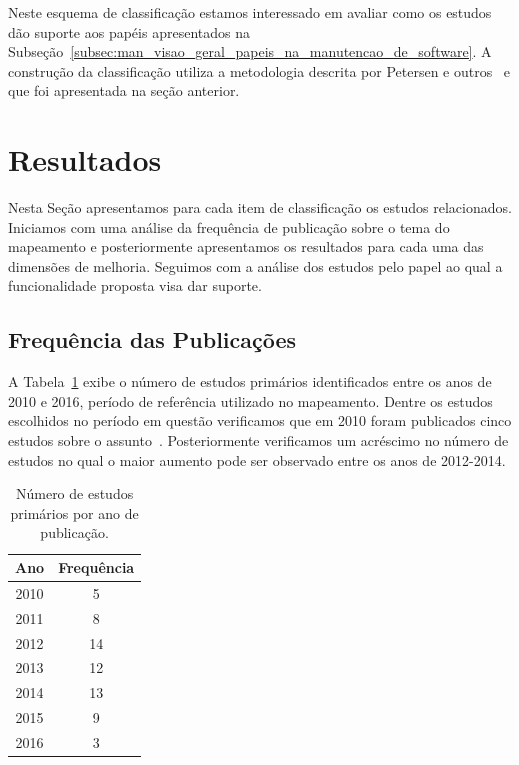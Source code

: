 Neste esquema de classificação estamos interessado em avaliar como os estudos
dão suporte aos papéis apresentados na
Subseção~\ref{subsec:man_visao_geral_papeis_na_manutencao_de_software}. A
construção da classificação utiliza a metodologia descrita por Petersen e
outros~\cite{Petersen2008} e que foi apresentada na seção anterior.

\section{Resultados}
\label{sec:mapeamento_resultados}

Nesta Seção apresentamos para cada item de classificação os estudos
relacionados. Iniciamos com uma análise da frequência de publicação sobre o tema
do mapeamento e posteriormente apresentamos os resultados para cada uma das
dimensões de melhoria. Seguimos com a análise dos estudos pelo papel ao qual a
funcionalidade proposta visa dar suporte.

\subsection{Frequência das Publicações}
\label{sub:frequencia_publicacao}

A Tabela~\ref{tab:publicacao_por_ano} exibe o número de estudos primários
identificados entre os anos de 2010 e 2016, período de referência utilizado no
mapeamento. Dentre os estudos escolhidos no período em questão verificamos que
em 2010 foram publicados cinco estudos sobre o
assunto~\cite{sun2010discriminative, gegick2010identifying, song2010jdf,
	nagwani2010predictive, zimmermann2010makes}. Posteriormente verificamos um
acréscimo no número de estudos no qual o maior aumento pode ser observado entre
os anos de 2012\@-\@2014.

\begin{table}[htpb]
\centering
\begin{tabular}{@{}cc@{}}
\toprule
\multicolumn{1}{l}{\textbf{Ano}} & \textbf{Frequência} \\ \midrule
2010 & 5 \\
2011 & 8 \\
2012 & 14 \\
2013 & 12 \\
2014 & 13 \\
2015 & 9 \\
2016 & 3 \\ \bottomrule
\end{tabular}
\caption{Número de estudos primários por ano de publicação.}
\label{tab:publicacao_por_ano}
\end{table}

